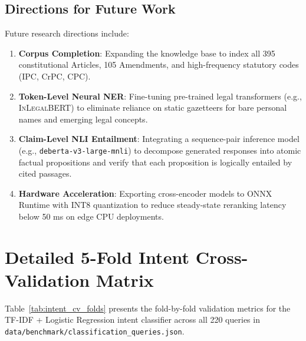 \documentclass[10pt,twocolumn]{article}
\begin{document}
\subsection{Directions for Future Work}
Future research directions include:
\begin{enumerate}[leftmargin=*]
    \item \textbf{Corpus Completion}: Expanding the knowledge base to index all 395 constitutional Articles, 105 Amendments, and high-frequency statutory codes (IPC, CrPC, CPC).
    \item \textbf{Token-Level Neural NER}: Fine-tuning pre-trained legal transformers (e.g., \textsc{InLegalBERT}) to eliminate reliance on static gazetteers for bare personal names and emerging legal concepts.
    \item \textbf{Claim-Level NLI Entailment}: Integrating a sequence-pair inference model (e.g., \texttt{deberta-v3-large-mnli}) to decompose generated responses into atomic factual propositions and verify that each proposition is logically entailed by cited passages.
    \item \textbf{Hardware Acceleration}: Exporting cross-encoder models to ONNX Runtime with INT8 quantization to reduce steady-state reranking latency below 50 ms on edge CPU deployments.
\end{enumerate}




\clearpage
\appendix

\section{Detailed 5-Fold Intent Cross-Validation Matrix}
\label{app:intent_cv}

Table~\ref{tab:intent_cv_folds} presents the fold-by-fold validation metrics for the TF-IDF + Logistic Regression intent classifier across all 220 queries in \texttt{data/benchmark/classification\_queries.json}.
\end{document}
